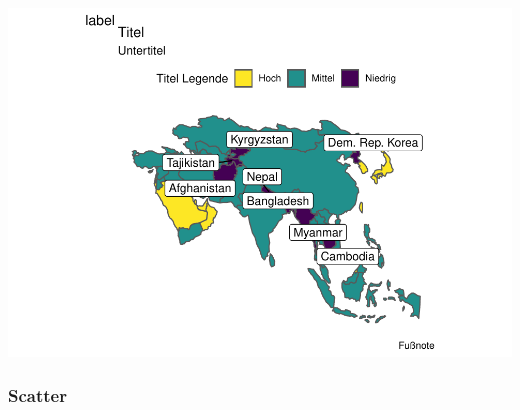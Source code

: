 \documentclass[
  twocolumn]{article}
\begin{document}
\includegraphics{PDFoutputsamples_files/figure-latex/unnamed-chunk-5-1.pdf}

\newpage

\hypertarget{scatter}{%
\subsubsection{Scatter}\label{scatter}}
\end{document}
